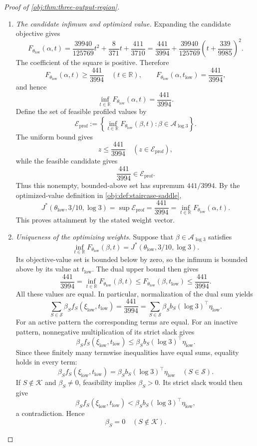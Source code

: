 \begin{proof}[Proof of \cref{obj:thm:three-output-region}]
\begin{enumerate}
\item \textit{The candidate infimum and optimized value.}
Expanding the candidate objective gives
\[
F_{\theta_{\mathrm{low}}}(\alpha,t)
=
\frac{39940}{125769}t^2+\frac8{371}t+\frac{411}{3710}
=
\frac{441}{3994}
+
\frac{39940}{125769}
\left(t+\frac{339}{9985}\right)^2.
\]
The coefficient of the square is positive. Therefore
\[
F_{\theta_{\mathrm{low}}}(\alpha,t)\ge\frac{441}{3994}
\quad(t\in\mathbb R),
\qquad
F_{\theta_{\mathrm{low}}}(\alpha,t_{\mathrm{low}})
=\frac{441}{3994},
\]
and hence
\[
\inf_{t\in\mathbb R}F_{\theta_{\mathrm{low}}}(\alpha,t)
=\frac{441}{3994}.
\]
Define the set of feasible profiled values by
\[
\mathcal E_{\mathrm{prof}}:=
\left\{
\inf_{t\in\mathbb R}F_{\theta_{\mathrm{low}}}(\beta,t):
\beta\in\mathcal A_{\log3}
\right\}.
\]
The uniform bound gives
\[
z\le\frac{441}{3994}\quad(z\in\mathcal E_{\mathrm{prof}}),
\]
while the feasible candidate gives
\[
\frac{441}{3994}\in\mathcal E_{\mathrm{prof}}.
\]
Thus this nonempty, bounded-above set has supremum \(441/3994\). By the optimized-value definition in \cref{obj:def:staircase-saddle},
\[
J^*(\theta_{\mathrm{low}},3/10,\log3)
=
\sup\mathcal E_{\mathrm{prof}}
=
\frac{441}{3994}
=
\inf_{t\in\mathbb R}F_{\theta_{\mathrm{low}}}(\alpha,t).
\]
This proves attainment by the stated weight vector.

\item \textit{Uniqueness of the optimizing weights.}
Suppose that \(\beta\in\mathcal A_{\log3}\) satisfies
\[
\inf_{t\in\mathbb R}F_{\theta_{\mathrm{low}}}(\beta,t)
=
J^*(\theta_{\mathrm{low}},3/10,\log3).
\]
Its objective-value set is bounded below by zero, so the infimum is bounded above by its value at \(t_{\mathrm{low}}\). The dual upper bound then gives
\[
\frac{441}{3994}
=
\inf_{t\in\mathbb R}F_{\theta_{\mathrm{low}}}(\beta,t)
\le
F_{\theta_{\mathrm{low}}}(\beta,t_{\mathrm{low}})
\le
\frac{441}{3994}.
\]
All these values are equal. In particular, normalization of the dual sum yields
\[
\sum_{S\in\mathcal S}\beta_S f_S(\xi_{\mathrm{low}},t_{\mathrm{low}})
=
\frac{441}{3994}
=
\sum_{S\in\mathcal S}\beta_S
b_S(\log3)^\top\eta_{\mathrm{low}}.
\]
For an active pattern the corresponding terms are equal. For an inactive pattern, nonnegative multiplication of its strict slack gives
\[
\beta_S f_S(\xi_{\mathrm{low}},t_{\mathrm{low}})
\le
\beta_S b_S(\log3)^\top\eta_{\mathrm{low}}.
\]
Since these finitely many termwise inequalities have equal sums, equality holds in every term:
\[
\beta_S f_S(\xi_{\mathrm{low}},t_{\mathrm{low}})
=
\beta_S b_S(\log3)^\top\eta_{\mathrm{low}}
\quad(S\in\mathcal S).
\]
If \(S\notin\mathcal K\) and \(\beta_S\ne0\), feasibility implies \(\beta_S>0\). Its strict slack would then give
\[
\beta_S f_S(\xi_{\mathrm{low}},t_{\mathrm{low}})
<
\beta_S b_S(\log3)^\top\eta_{\mathrm{low}},
\]
a contradiction. Hence
\[
\beta_S=0\quad(S\notin\mathcal K).
\]


\end{enumerate}
\end{proof}
